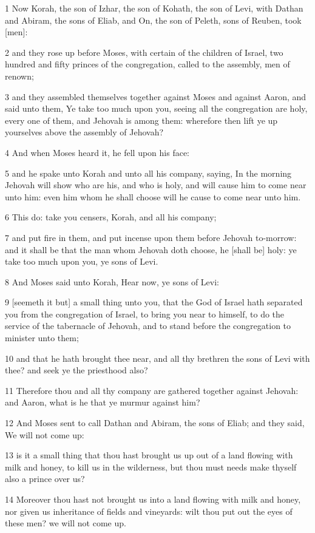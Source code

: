 \par 1 Now Korah, the son of Izhar, the son of Kohath, the son of Levi, with Dathan and Abiram, the sons of Eliab, and On, the son of Peleth, sons of Reuben, took [men]:
\par 2 and they rose up before Moses, with certain of the children of Israel, two hundred and fifty princes of the congregation, called to the assembly, men of renown;
\par 3 and they assembled themselves together against Moses and against Aaron, and said unto them, Ye take too much upon you, seeing all the congregation are holy, every one of them, and Jehovah is among them: wherefore then lift ye up yourselves above the assembly of Jehovah?
\par 4 And when Moses heard it, he fell upon his face:
\par 5 and he spake unto Korah and unto all his company, saying, In the morning Jehovah will show who are his, and who is holy, and will cause him to come near unto him: even him whom he shall choose will he cause to come near unto him.
\par 6 This do: take you censers, Korah, and all his company;
\par 7 and put fire in them, and put incense upon them before Jehovah to-morrow: and it shall be that the man whom Jehovah doth choose, he [shall be] holy: ye take too much upon you, ye sons of Levi.
\par 8 And Moses said unto Korah, Hear now, ye sons of Levi:
\par 9 [seemeth it but] a small thing unto you, that the God of Israel hath separated you from the congregation of Israel, to bring you near to himself, to do the service of the tabernacle of Jehovah, and to stand before the congregation to minister unto them;
\par 10 and that he hath brought thee near, and all thy brethren the sons of Levi with thee? and seek ye the priesthood also?
\par 11 Therefore thou and all thy company are gathered together against Jehovah: and Aaron, what is he that ye murmur against him?
\par 12 And Moses sent to call Dathan and Abiram, the sons of Eliab; and they said, We will not come up:
\par 13 is it a small thing that thou hast brought us up out of a land flowing with milk and honey, to kill us in the wilderness, but thou must needs make thyself also a prince over us?
\par 14 Moreover thou hast not brought us into a land flowing with milk and honey, nor given us inheritance of fields and vineyards: wilt thou put out the eyes of these men? we will not come up.
